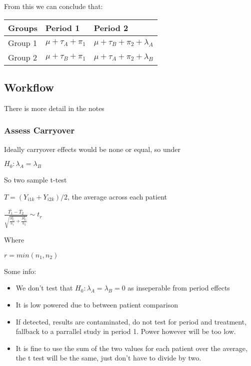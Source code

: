 \documentclass[
  letterpaper,
  DIV=11,
  numbers=noendperiod]{scrreprt}
\providecommand{\tightlist}{%
  \setlength{\itemsep}{0pt}\setlength{\parskip}{0pt}}\usepackage{longtable,booktabs,array}
\begin{document}
From this we can conclude that:

\begin{longtable}[]{@{}lll@{}}
\toprule()
Groups & Period 1 & Period 2 \\
\midrule()
\endhead
Group 1 & \(\mu + \tau_A + \pi_1\) &
\(\mu + \tau_B + \pi_2 + \lambda_A\) \\
Group 2 & \(\mu + \tau_B + \pi_1\) &
\(\mu + \tau_A + \pi_2 + \lambda_B\) \\
\bottomrule()
\end{longtable}

\hypertarget{workflow}{%
\subsection{Workflow}\label{workflow}}

There is more detail in the notes

\hypertarget{assess-carryover}{%
\subsubsection{Assess Carryover}\label{assess-carryover}}

Ideally carryover effects would be none or equal, so under

\(H_0 : \lambda_A = \lambda_B\)

So two sample t-test

\(T = (Y_{i1k} +Y_{i2k})/2\), the average across each patient

\(\frac{\bar{T_1} - \bar{T_2}} {\sqrt{  \frac{S^2_{T_1}}{n_1} +  \frac{S^2_{T_2}}{n_2} }} \sim t_r\)

Where

\(r = min(n_1, n_2)\)

Some info:

\begin{itemize}
\tightlist
\item
  We don't test that \(H_0 : \lambda_A = \lambda_B= 0\) as inseperable
  from period effects
\item
  It is low powered due to between patient comparison
\item
  If detected, results are contaminated, do not test for period and
  treatment, fallback to a parrallel study in period 1. Power however
  will be too low.
\item
  It is fine to use the sum of the two values for each patient over the
  average, the t test will be the same, just don't have to divide by
  two.
\end{itemize}
\end{document}
